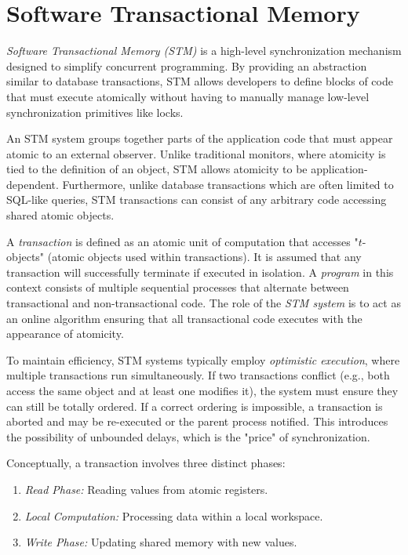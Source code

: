 \chapter{Software Transactional Memory}
\textit{Software Transactional Memory (STM)} is a high-level synchronization mechanism designed to simplify concurrent programming. By providing an abstraction similar to database transactions, STM allows developers to define blocks of code that must execute atomically without having to manually manage low-level synchronization primitives like locks.

An STM system groups together parts of the application code that must appear atomic to an external observer. Unlike traditional monitors, where atomicity is tied to the definition of an object, STM allows atomicity to be application-dependent. Furthermore, unlike database transactions which are often limited to SQL-like queries, STM transactions can consist of any arbitrary code accessing shared atomic objects.

A \textit{transaction} is defined as an atomic unit of computation that accesses "$t$-objects" (atomic objects used within transactions). It is assumed that any transaction will successfully terminate if executed in isolation. A \textit{program} in this context consists of multiple sequential processes that alternate between transactional and non-transactional code. The role of the \textit{STM system} is to act as an online algorithm ensuring that all transactional code executes with the appearance of atomicity.

To maintain efficiency, STM systems typically employ \textit{optimistic execution}, where multiple transactions run simultaneously. If two transactions conflict (e.g., both access the same object and at least one modifies it), the system must ensure they can still be totally ordered. If a correct ordering is impossible, a transaction is aborted and may be re-executed or the parent process notified. This introduces the possibility of unbounded delays, which is the "price" of synchronization.

Conceptually, a transaction involves three distinct phases:
\begin{enumerate}
    \item \textit{Read Phase:} Reading values from atomic registers.
    \item \textit{Local Computation:} Processing data within a local workspace.
    \item \textit{Write Phase:} Updating shared memory with new values.
\end{enumerate}
    

